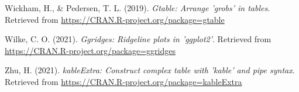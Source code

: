 \documentclass[
  man]{apa6}
\newlength{\cslhangindent}
\newlength{\cslentryspacingunit} %
\newenvironment{CSLReferences}[2] %
 {%
  \setlength{\parindent}{0pt}
  \ifodd #1
  \let\oldpar\par
  \def\par{\hangindent=\cslhangindent\oldpar}
  \fi
  \setlength{\parskip}{#2\cslentryspacingunit}
 }%
 {}
\begin{document}
\begin{CSLReferences}{1}{0}
\leavevmode{}%
Wickham, H., \& Pedersen, T. L. (2019). \emph{Gtable: Arrange 'grobs' in tables}. Retrieved from \url{https://CRAN.R-project.org/package=gtable}

\leavevmode{}%
Wilke, C. O. (2021). \emph{Ggridges: Ridgeline plots in 'ggplot2'}. Retrieved from \url{https://CRAN.R-project.org/package=ggridges}

\leavevmode{}%
Zhu, H. (2021). \emph{kableExtra: Construct complex table with 'kable' and pipe syntax}. Retrieved from \url{https://CRAN.R-project.org/package=kableExtra}

\end{CSLReferences}

\endgroup
\end{document}

